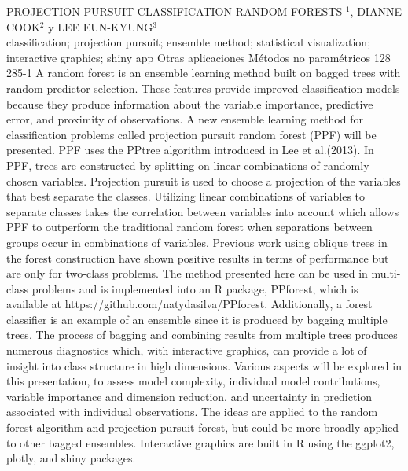\A
{PROJECTION PURSUIT CLASSIFICATION RANDOM FORESTS}
{$^1$, DIANNE COOK$^2$ y LEE EUN-KYUNG$^3$}
{
\\}
{classification; projection pursuit; ensemble method; statistical visualization; interactive graphics; shiny app} 
 {Otras aplicaciones} 
 {Métodos no paramétricos} 
 {128} 
 {285-1}
{A random forest is an ensemble learning method built on bagged trees with random predictor selection. These features provide improved classification models because they produce information about the variable importance, predictive error, and proximity of observations. A new ensemble learning method for classification problems called projection pursuit random forest (PPF) will be presented. PPF uses the PPtree algorithm introduced in Lee et al.(2013). In PPF, trees are constructed by splitting on linear combinations of randomly chosen variables. Projection pursuit is used to choose a projection of the variables that best separate the classes. Utilizing linear combinations of variables to separate classes takes the correlation between variables into account which allows PPF to outperform the traditional random forest when separations between groups occur in combinations of variables. Previous work using oblique trees in the forest construction have shown positive results in terms of performance but are only for two-class problems. The method presented here can be used in multi-class problems and is implemented into an R package, PPforest, which is available at https://github.com/natydasilva/PPforest. Additionally, a forest classifier is an example of an ensemble since it is produced by bagging multiple trees. The process of bagging and combining results from multiple trees produces numerous diagnostics which, with interactive graphics, can provide a lot of insight into class structure in high dimensions. Various aspects will be explored in this presentation, to assess model complexity, individual model contributions, variable importance and dimension reduction, and uncertainty in prediction associated with individual observations. The ideas are applied to the random forest algorithm and projection pursuit forest, but could be more broadly applied to other bagged ensembles. Interactive graphics are built in R using the ggplot2, plotly, and shiny packages.}

